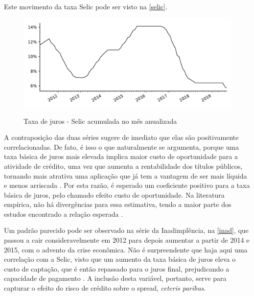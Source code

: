 \documentclass[a4paper,
               article,
               12pt,
               openany,
               oneside,
               english,
               brazil]{abntex2}
\numberwithin{equation}{section}
\begin{document}
    Este movimento da taxa Selic pode ser visto na \autoref{selic}. 
    
    \begin{figure}[hbt]
        \centering
        \caption{Taxa de juros - Selic acumulada no mês anualizada}
        \includegraphics[width = \textwidth, scale=0.75]{selic.pdf}
        \label{selic}
    \end{figure}

    A contraposição das duas séries sugere de imediato que elas são positivamente correlacionadas. De fato, é isso o que naturalmente se argumenta, porque uma taxa básica de juros mais elevada implica maior custo de oportunidade para a atividade de crédito, uma vez que aumenta a rentabilidade dos títulos públicos, tornando mais atrativa uma aplicação que já tem a vantagem de ser mais líquida e menos arriscada \cite[p.~372]{oliveira2007}. Por esta razão, é esperado um coeficiente positivo para a taxa básica de juros, pelo chamado efeito custo de oportunidade. Na literatura empírica, não há divergências para essa estimativa, tendo a maior parte dos estudos encontrado a relação esperada \cite[p.~233-234]{leal07}.

    Um padrão parecido pode ser observado na série da Inadimplência, na \autoref{inad}, que passou a cair consideravelmente em 2012 para depois aumentar a partir de 2014 e 2015, com o advento da crise econômica. Não é surpreendente que haja aqui uma correlação com a Selic, visto que um aumento da taxa básica de juros eleva o custo de captação, que é então repassado para o juros final, prejudicando a capacidade de pagamento \cite[p.~390]{oliveira2007}. A inclusão desta variável, portanto, serve para capturar o efeito do risco de crédito sobre o spread, \textit{ceteris paribus}.
\end{document}
